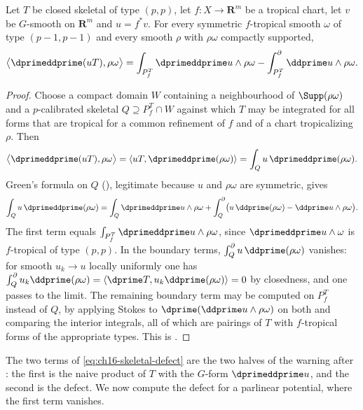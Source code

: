 \begin{proposition}
\label{prop:ch16-skeletal-defect}
Let $T$ be closed skeletal of type $(p,p)$, let $f:X\to\mathbf R^m$ be a
tropical chart, let $v$ be $G$-smooth on $\mathbf R^m$ and $u=f^*v$.  For
every symmetric $f$-tropical smooth $\omega$ of type $(p-1,p-1)$ and every
smooth $\rho$ with $\rho\omega$ compactly supported,
\begin{equation}
\label{eq:ch16-skeletal-defect}
 \bigl\langle\dprimeddprime(uT),\rho\omega\bigr\rangle
 =\int_{P^T_f}\dprimeddprime u\wedge\rho\omega
   -\int^{\partial}_{P^T_f}\ddprime u\wedge\rho\omega .
\end{equation}
\end{proposition}

\begin{proof}
Choose a compact domain $W$ containing a neighbourhood of $\Supp(\rho\omega)$
and a $p$-calibrated skeletal $Q\supseteq P^T_f\cap W$ against which $T$ may
be integrated for all forms that are tropical for a common refinement of $f$
and of a chart tropicalizing $\rho$.  Then
\[
 \bigl\langle\dprimeddprime(uT),\rho\omega\bigr\rangle
 =\langle uT,\dprimeddprime(\rho\omega)\rangle
 =\int_Qu\,\dprimeddprime(\rho\omega).
\]
Green's formula on $Q$ (), legitimate because $u$
and $\rho\omega$ are symmetric, gives
\[
 \int_Qu\,\dprimeddprime(\rho\omega)
 =\int_Q\dprimeddprime u\wedge\rho\omega
  +\int^\partial_Q\bigl(u\,\ddprime(\rho\omega)-\ddprime u\wedge\rho\omega
  \bigr).
\]
The first term equals $\int_{P^T_f}\dprimeddprime u\wedge\rho\omega$, since
$\dprimeddprime u\wedge\omega$ is $f$-tropical of type $(p,p)$.  In the
boundary terms, $\int^\partial_Qu\,\ddprime(\rho\omega)$ vanishes: for
smooth $u_k\to u$ locally uniformly one has
$\int^\partial_Qu_k\ddprime(\rho\omega)
 =\langle\dprime T,u_k\ddprime(\rho\omega)\rangle=0$ by closedness, and one
passes to the limit.  The remaining boundary term may be computed on
$P^T_f$ instead of $Q$, by applying Stokes to
$\dprime(\ddprime u\wedge\rho\omega)$ on both and comparing the interior
integrals, all of which are pairings of $T$ with $f$-tropical forms of the
appropriate types.  This is \cite[Proposition~8.10.2]{CLD25}.
\end{proof}

The two terms of \eqref{eq:ch16-skeletal-defect} are the two halves of the
warning after : the first is the naive
product of $T$ with the $G$-form $\dprimeddprime u$, and the second is the
defect.  We now compute the defect for a parlinear potential, where the
first term vanishes.

